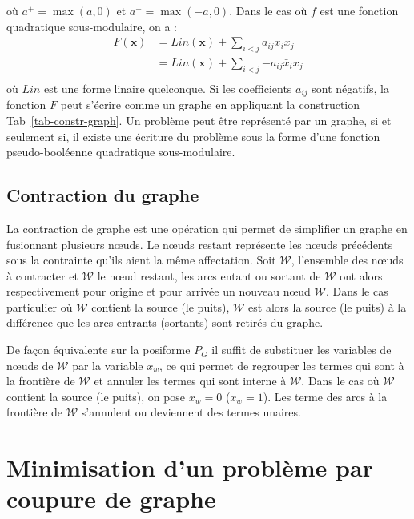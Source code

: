 \documentclass[../main/These_Mathias_Paget.tex]{subfiles}
\begin{document}
	où $a^{+} = \max(a,0)$ et $a^{-} = \max(-a,0)$. Dans le cas où $f$ est une fonction quadratique sous-modulaire, on a :
	\begin{equation}
	\begin{aligned}
		F(\boldsymbol{x}) &= Lin(\boldsymbol{x}) + \sum_{i<j}{a_{ij}x_ix_j} \\
						 &= Lin(\boldsymbol{x}) + \sum_{i<j}{-a_{ij}\bar{x}_ix_j} \\
	\end{aligned}
	\end{equation}	
où $Lin$ est une forme linaire quelconque. Si les coefficients $a_{ij}$ sont négatifs, la fonction $F$ peut s'écrire comme un graphe en appliquant la construction Tab~\ref{tab-constr-graph}. Un problème peut être représenté par un graphe, si et seulement si, il existe une écriture du problème sous la forme d'une fonction pseudo-booléenne quadratique sous-modulaire.

\subsection{Contraction du graphe}

La contraction de graphe est une opération qui permet de simplifier un graphe en fusionnant plusieurs nœuds. Le nœuds restant représente les nœuds précédents sous la contrainte qu'ils aient la même affectation. Soit $\boldsymbol{\mathcal{W}}$, l'ensemble des nœuds à contracter et $\mathcal{W}$ le nœud restant, les arcs entant ou sortant de $\boldsymbol{\mathcal{W}}$ ont alors respectivement pour origine et pour arrivée un nouveau nœud $\mathcal{W}$. Dans le cas particulier où $\boldsymbol{\mathcal{W}}$ contient la source (le puits), $\mathcal{W}$ est alors la source (le puits) à la différence que les arcs entrants (sortants) sont retirés du graphe.

De façon équivalente sur la posiforme $P_G$ il suffit de substituer les variables de nœuds de $\boldsymbol{\mathcal{W}}$ par la variable $x_w$, ce qui permet de regrouper les termes qui sont à la frontière de $\boldsymbol{\mathcal{W}}$ et annuler les termes qui sont interne à $\boldsymbol{\mathcal{W}}$. Dans le cas où $\boldsymbol{\mathcal{W}}$ contient la source (le puits), on pose $x_w=0$ ($x_w=1$). Les terme des arcs à la frontière de $\boldsymbol{\mathcal{W}}$ s'annulent ou deviennent des termes unaires.

\section{Minimisation d'un problème par coupure de graphe}
\label{s:min_GC}
\end{document}
